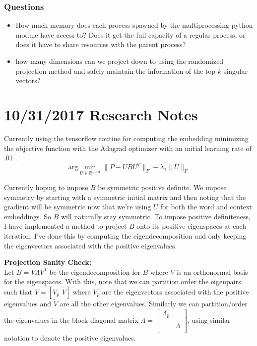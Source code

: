 \documentclass{report}
\newcommand{\argmin}[2]{\text{arg}\min_{#1}#2}
\newcommand{\partitionedV}{[V_p \,\,\tilde{V}]}
\newcommand{\BigLambda}{\begin{bmatrix}
													\Lambda_p & \\
													&\tilde{\Lambda}\\
												\end{bmatrix}}
\begin{document}
	    \subsubsection{Questions}
	      \begin{itemize}
	      	\item How much memory does each process spawned by the multiprocessing python module have access to? Does it get the full capacity of a regular process, or does it have to share resources with the parent process? 
	      	\item how many dimensions can we project down to using the randomized projection method and safely maintain the information of the top $ k $ singular vectors?
	      \end{itemize}
	    
	    
	    
	    
	    
	    
	    
	
	\newpage
	\section{10/31/2017 Research Notes}
	
	Currently using the tensorflow routine for computing the embedding minimizing the objective function with the Adagrad optimizer with an initial learning rate of .01 . 
	\[ 
	  \argmin{U \in \mathbb{R}^{n \times d}}{\|P - UBU^T\|_{F} - \lambda_1\|U\|_{F}} 
	\]
	
  Currently hoping to impose $ B $ be symmetric positive definite. We impose symmetry by starting with a symmetric initial matrix and then noting that the gradient will be symmetric now that we're using $ U $ for both the word and context embeddings. So $ B $ will naturally stay symmetric. To impose positive definiteness, I have implemented a method to project $ B $ onto its positive eigenspaces at each iteration. I've done this by computing the eigendecomposition and only keeping the eigenvectors associated with the positive eigenvalues. 
  
  \textbf{Projection Sanity Check:}\\
  Let $ B = V\Lambda V^T $ be the eigendecomposition for $ B $ where $ V $ is an orthonormal basis for the eigenspaces. With this, note that we can partition.order the eigenpairs such that $ V = \partitionedV $ where $ V_p $ are the eigenvectors associated with the positive eigenvalues and $ \tilde{V} $ are all the other eigenvalues. Similarly we can partition/order the eigenvalues in the block diagonal matrix $ \Lambda =  \BigLambda$, using similar notation to denote the positive eigenvalues. 
  
\end{document}
